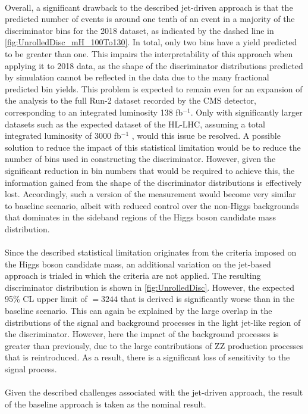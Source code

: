 \\
Overall, a significant drawback to the described jet-driven approach is that the predicted number of events is around one tenth of an event in a majority of the discriminator bins for the 2018 dataset, as indicated by the dashed line in \autoref{fig:UnrolledDisc_mH_100To130}. In total, only two bins have a yield predicted to be greater than one. This impairs the interpretability of this approach when applying it to 2018 data, as the shape of the discriminator distributions predicted by simulation cannot be reflected in the data due to the many fractional predicted bin yields. This problem is expected to remain even for an expansion of the analysis to the full Run-2 dataset recorded by the CMS detector, corresponding to an integrated luminosity 138 fb$^{-1}$. Only with significantly larger datasets such as the expected dataset of the HL-LHC, assuming a total integrated luminosity of 3000 fb$^{-1}$ \cite{HL-LHC}, would this issue be resolved. A possible solution to reduce the impact of this statistical limitation would be to reduce the number of bins used in constructing the discriminator. However, given the significant reduction in bin numbers that would be required to achieve this, the information gained from the shape of the discriminator distributions is effectively lost. Accordingly, such a version of the measurement would become very similar to baseline scenario, albeit with reduced control over the non-Higgs backgrounds that dominates in the sideband regions of the Higgs boson candidate mass distribution. \\
\\
Since the described statistical limitation originates from the criteria imposed on the Higgs boson candidate mass, an additional variation on the jet-based approach is trialed in which the criteria are not applied. The resulting discriminator distribution is shown in \autoref{fig:UnrolledDisc}. However, the expected 95\% CL upper limit of \sBR$ = 3244$ that is derived is significantly worse than in the baseline scenario. This can again be explained by the large overlap in the distributions of the signal and background processes in the light jet-like region of the discriminator. However, here the impact of the background processes is greater than previously, due to the large contributions of ZZ production processes that is reintroduced. As a result, there is a significant loss of sensitivity to the signal process. \\
\\
Given the described challenges associated with the jet-driven approach, the result of the baseline approach is taken as the nominal result.
